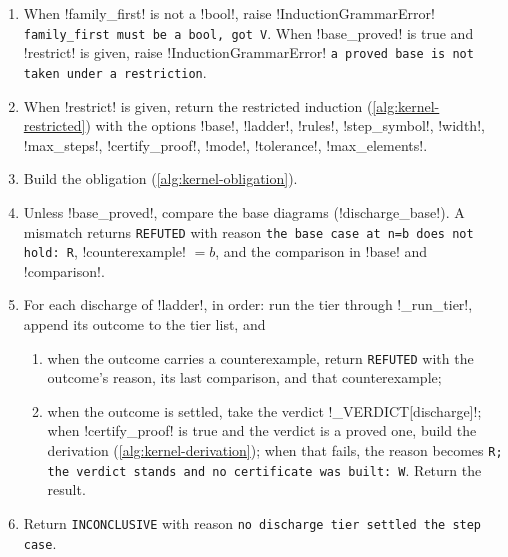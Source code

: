 \begin{algorithm}\label{alg:kernel-prove-by-induction}
\begin{enumerate}
\item When \code!family_first! is not a \py!bool!, raise \py!InductionGrammarError! \texttt{family\_\allowbreak{}first must be a bool,\allowbreak{} got V}. When \code!base_proved! is true and \code!restrict! is given, raise \py!InductionGrammarError! \texttt{a proved base is not taken under a restriction}.
\item When \code!restrict! is given, return the restricted induction (\cref{alg:kernel-restricted}) with the options \code!base!, \code!ladder!, \code!rules!, \code!step_symbol!, \code!width!, \code!max_steps!, \code!certify_proof!, \code!mode!, \code!tolerance!, \code!max_elements!.
\item Build the obligation (\cref{alg:kernel-obligation}).
\item Unless \code!base_proved!, compare the base diagrams (\py!discharge_base!). A mismatch returns \texttt{REFUTED} with reason \texttt{the base case at n=b does not hold: R}, \py!counterexample! $=b$, and the comparison in \py!base! and \py!comparison!.
\item For each discharge of \code!ladder!, in order: run the tier through \py!_run_tier!, append its outcome to the tier list, and
  \begin{enumerate}
  \item when the outcome carries a counterexample, return \texttt{REFUTED} with the outcome's reason, its last comparison, and that counterexample;
  \item when the outcome is settled, take the verdict \py!_VERDICT[discharge]!; when \code!certify_proof! is true and the verdict is a proved one, build the derivation (\cref{alg:kernel-derivation}); when that fails, the reason becomes \texttt{R; the verdict stands and no certificate was built: W}. Return the result.
  \end{enumerate}
\item Return \texttt{INCONCLUSIVE} with reason \texttt{no discharge tier settled the step case}.
\end{enumerate}
\end{algorithm}

